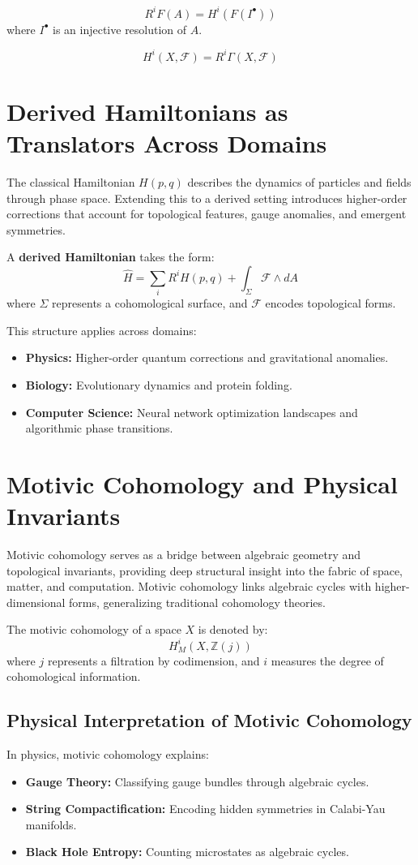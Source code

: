 \documentclass{article}
\begin{document}
\[
R^i F(A) = H^i(F(I^\bullet))
\]
where \( I^\bullet \) is an injective resolution of \( A \).

\[
H^i(X, \mathcal{F}) = R^i \Gamma(X, \mathcal{F})
\]

\section{Derived Hamiltonians as Translators Across Domains}
The classical Hamiltonian \( H(p, q) \) describes the dynamics of particles and fields through phase space. Extending this to a derived setting introduces higher-order corrections that account for topological features, gauge anomalies, and emergent symmetries.

A \textbf{derived Hamiltonian} takes the form:
\[
\hat{H} = \sum_i R^i H(p, q) + \int_\Sigma \mathcal{F} \wedge dA
\]
where \( \Sigma \) represents a cohomological surface, and \( \mathcal{F} \) encodes topological forms.

This structure applies across domains:
\begin{itemize}
    \item \textbf{Physics:} Higher-order quantum corrections and gravitational anomalies.
    \item \textbf{Biology:} Evolutionary dynamics and protein folding.
    \item \textbf{Computer Science:} Neural network optimization landscapes and algorithmic phase transitions.
\end{itemize}

\section{Motivic Cohomology and Physical Invariants}
Motivic cohomology serves as a bridge between algebraic geometry and topological invariants, providing deep structural insight into the fabric of space, matter, and computation. Motivic cohomology links algebraic cycles with higher-dimensional forms, generalizing traditional cohomology theories.

The motivic cohomology of a space \( X \) is denoted by:
\[
H^i_M(X, \mathbb{Z}(j))
\]
where \( j \) represents a filtration by codimension, and \( i \) measures the degree of cohomological information.

\subsection{Physical Interpretation of Motivic Cohomology}
In physics, motivic cohomology explains:
\begin{itemize}
    \item \textbf{Gauge Theory:} Classifying gauge bundles through algebraic cycles.
    \item \textbf{String Compactification:} Encoding hidden symmetries in Calabi-Yau manifolds.
    \item \textbf{Black Hole Entropy:} Counting microstates as algebraic cycles.
\end{itemize}
\end{document}
